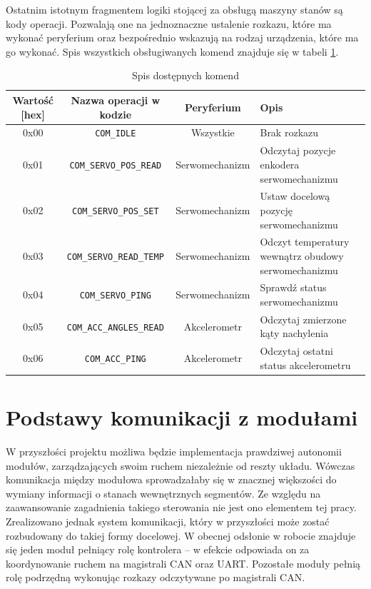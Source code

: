 Ostatnim istotnym fragmentem logiki stojącej za obsługą maszyny stanów są kody operacji. Pozwalają one na jednoznaczne ustalenie rozkazu, które ma wykonać peryferium oraz bezpośrednio wskazują na rodzaj urządzenia, które ma go wykonać. Spis wszystkich obsługiwanych komend znajduje się w tabeli \ref{tab: per_cnd}.

\clearpage

    \begin{table}[ht!]
     \centering
      \begin{tabular}{ c | c | c | p{5.5cm}}
            Wartość [hex] & Nazwa operacji w kodzie & Peryferium & Opis \\ \hline \hline
            0x00 & \texttt{COM\_IDLE} & Wszystkie & Brak rozkazu \\ \hline
            0x01 & \texttt{COM\_SERVO\_POS\_READ} & Serwomechanizm & Odczytaj pozycje enkodera serwomechanizmu \\ \hline
            0x02 & \texttt{COM\_SERVO\_POS\_SET} & Serwomechanizm & Ustaw docelową pozycję serwomechanizmu \\ \hline
            0x03 & \texttt{COM\_SERVO\_READ\_TEMP} & Serwomechanizm & Odczyt temperatury wewnątrz obudowy serwomechanizmu \\ \hline
            0x04 & \texttt{COM\_SERVO\_PING} & Serwomechanizm & Sprawdź status serwomechanizmu \\ \hline
            0x05 & \texttt{COM\_ACC\_ANGLES\_READ} & Akcelerometr & Odczytaj zmierzone kąty nachylenia \\ \hline
            0x06 & \texttt{COM\_ACC\_PING} & Akcelerometr & Odczytaj ostatni status akcelerometru  \\
      \end{tabular}
     \caption{\label{tab: per_cnd} Spis dostępnych komend}
    \end{table}

\section{Podstawy komunikacji z modułami}
W przyszłości projektu możliwa będzie implementacja prawdziwej autonomii modułów, zarządzających swoim ruchem niezależnie od reszty układu. Wówczas komunikacja między modułowa sprowadzałaby się w znacznej większości do wymiany informacji o stanach wewnętrznych segmentów. Ze względu na zaawansowanie zagadnienia takiego sterowania nie jest ono elementem tej pracy. Zrealizowano jednak system komunikacji, który w przyszłości może zostać rozbudowany do takiej formy docelowej. W obecnej odsłonie w robocie znajduje się jeden moduł pełniący rolę kontrolera -- w efekcie odpowiada on za koordynowanie ruchem na magistrali CAN oraz UART. Pozostałe moduły pełnią rolę podrzędną wykonując rozkazy odczytywane po magistrali CAN. 
